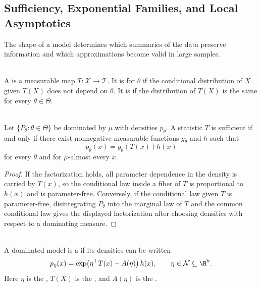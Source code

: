 \subsection{Sufficiency, Exponential Families, and Local Asymptotics}

The shape of a model determines which summaries of the data preserve information and which approximations become valid in large samples.

\begin{definition} \label{def:statistics-sufficiency-ancillarity} \\
A  is a measurable map $T:\mathcal{X}\to\mathcal{T}$.  It is  for $\theta$ if the conditional distribution of $X$ given $T(X)$ does not depend on $\theta$.  It is  if the distribution of $T(X)$ is the same for every $\theta\in\Theta$.
\end{definition}

\begin{theorem} \label{thm:factorization-criterion-sufficiency} \\
Let $\{P_\theta:\theta\in\Theta\}$ be dominated by $\mu$ with densities $p_\theta$.  A statistic $T$ is sufficient if and only if there exist nonnegative measurable functions $g_\theta$ and $h$ such that
\[
p_\theta(x)=g_\theta(T(x))h(x)
\]
for every $\theta$ and for $\mu$-almost every $x$.
\begin{proof}
If the factorization holds, all parameter dependence in the density is carried by $T(x)$, so the conditional law inside a fiber of $T$ is proportional to $h(x)$ and is parameter-free.  Conversely, if the conditional law given $T$ is parameter-free, disintegrating $P_\theta$ into the marginal law of $T$ and the common conditional law gives the displayed factorization after choosing densities with respect to a dominating measure.
\end{proof}
\end{theorem}

\begin{definition} \label{def:exponential-family-natural-statistic} \\
A dominated model is a  if its densities can be written
\[
p_\eta(x)=\exp\!\left(\eta^\top T(x)-A(\eta)\right)h(x),
\qquad \eta\in\mathcal{N}\subseteq\R^k.
\]
Here $\eta$ is the , $T(X)$ is the , and $A(\eta)$ is the .
\end{definition}

